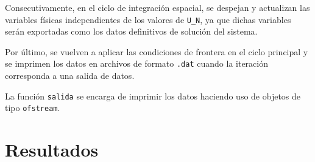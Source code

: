 Consecutivamente, en el ciclo de integración espacial, se despejan y actualizan las variables físicas independientes de los valores de \texttt{U\_N}, ya que dichas variables serán exportadas como los datos definitivos de solución del sistema.


Por último, se vuelven a aplicar las condiciones de frontera en el ciclo principal y se imprimen los datos en archivos de formato \texttt{.dat} cuando la iteración corresponda a una salida de datos.


La función \texttt{salida} se encarga de imprimir los datos haciendo uso de objetos de tipo \texttt{ofstream}.

\section{Resultados}
